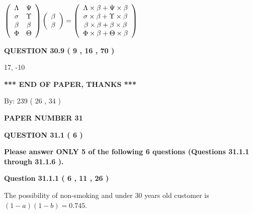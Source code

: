\documentclass[12pt]{article}
\begin{document}
$  %
 \left( \begin{array}
 {
 c
 c
 }
 \Lambda & 
 \Psi \\ 
 \sigma & 
 \Upsilon \\ 
 \beta & 
 \beta \\ 
 \Phi & 
 \Theta
 \end{array} \right)
 \left( \begin{array}
 {
 c
 }
 \beta \\ 
 \beta
 \end{array} \right)
=
 \left( \begin{array}
 {
 c
 }
  \Lambda \times  \beta +  \Psi \times  \beta \\ 
  \sigma \times  \beta +  \Upsilon \times  \beta \\ 
  \beta \times  \beta +  \beta \times  \beta \\ 
  \Phi \times  \beta +  \Theta \times  \beta
 \end{array} \right)
$
 
  
  
{\textbf{\large{QUESTION
30.9 
 (           9 ,          16 ,          70 )
}}}

17,  %
-10
 
   
   
   
   
\vspace{1.0in} 
{\textbf{\large{ *** END OF PAPER, THANKS *** }}} 
   
   
\hspace{1.0in} By: 
         239 (          26 ,           34 )
   
   
   
   
\newpage 
\setcounter{page}{ 
    31001 } 
   
   
 {\textbf{ \Large{ PAPER NUMBER           31  }}}
   
   
   
   
  
\vspace{0.2in}
  
{\textbf{\Large{QUESTION
31.1 
 (           6 )
}}}
  
  
{\textbf{\Large{Please answer ONLY  %
           5  %
 of the following  %
           6  %
 questions (Questions  %
31.1.1 %
 through  %
31.1.6 %
 ). }}}
   
   
  
  
{\textbf{\large{Question
31.1.1 
 (           6 ,          11 ,          26 )
}}}

The possibility of  %
 non-smoking and  %
under 30 years old
customer is $ (1-a)(1-b) =  %
0.745 $.
  
\end{document}
